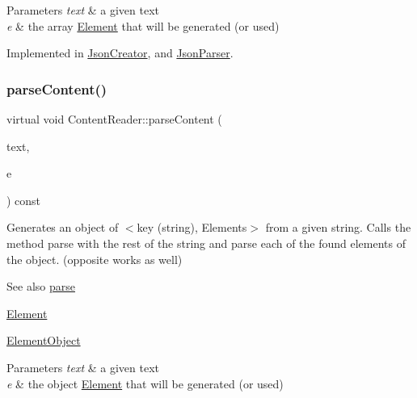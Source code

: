 \begin{DoxyParams}{Parameters}
{\em text} & a given text \\
\hline
{\em e} & the array \mbox{\hyperlink{classElement}{Element}} that will be generated (or used) \\
\hline
\end{DoxyParams}


Implemented in \mbox{\hyperlink{classJsonCreator_a694669d359eb73890a9e9f247c4ebab4}{Json\+Creator}}, and \mbox{\hyperlink{classJsonParser_aa728c443b247b83cdf6cedb406d8940d}{Json\+Parser}}.

\mbox{\label{classContentReader_a59a8de2bf3436e46b4d029a9b3c3c9da}} 
\subsubsection{\texorpdfstring{parse\+Content()}{parseContent()}\hspace{0.1cm}{\footnotesize\ttfamily [5/6]}}
{\footnotesize\ttfamily virtual void Content\+Reader\+::parse\+Content (\begin{DoxyParamCaption}\item[{std\+::string \&}]{text,  }\item[{\mbox{\hyperlink{classElementObject}{Element\+Object}} $\ast$}]{e }\end{DoxyParamCaption}) const\hspace{0.3cm}{\ttfamily [pure virtual]}}

Generates an object of $<$key (string), Elements$>$ from a given string. Calls the method parse with the rest of the string and parse each of the found elements of the object. (opposite works as well) \begin{DoxySeeAlso}{See also}
\mbox{\hyperlink{classContentReader_a7fff2e63a2e8fa216665604f69974e1d}{parse}} 

\mbox{\hyperlink{classElement}{Element}} 

\mbox{\hyperlink{classElementObject}{Element\+Object}}
\end{DoxySeeAlso}

\begin{DoxyParams}{Parameters}
{\em text} & a given text \\
\hline
{\em e} & the object \mbox{\hyperlink{classElement}{Element}} that will be generated (or used) \\
\hline
\end{DoxyParams}


